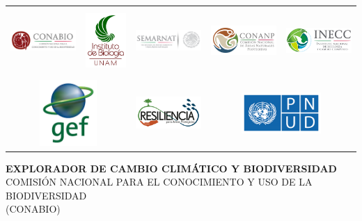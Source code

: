 \begin{titlepage}
\begin{center}
\begin{table}[h!]
\begin{tabular}{ccccc}
				\includegraphics[width=3cm]{./logos/conabio.png} &
				\includegraphics[height=2.5cm]{./logos/unam.png} &
				\includegraphics[width=3cm]{./logos/semarnat.png} &
				\includegraphics[width=3cm]{./logos/conanp.png} &
				\includegraphics[width=3cm]{./logos/logoINECC.png} \\


				\multicolumn{2}{c}{\includegraphics[height=2.5cm]{./logos/gef.png}} &
				\multicolumn{1}{c}{\includegraphics[width=3cm]{./logos/resiliencia.png}} &
				\multicolumn{2}{c}{\includegraphics[width=3cm]{./logos/pnud.png}}


			\end{tabular}
	\end{table}
	\vspace{2.5cm}
	\huge{\textbf{EXPLORADOR DE CAMBIO CLIM\'ATICO Y BIODIVERSIDAD }}\\
	\large{COMISI\'ON NACIONAL PARA EL CONOCIMIENTO Y USO DE LA BIODIVERSIDAD \\
	(CONABIO)} \\


\end{center}
\end{titlepage}
